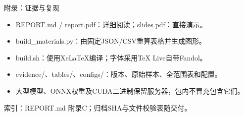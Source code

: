 \documentclass[UTF8,fontset=fandol,aspectratio=169,10pt]{ctexbeamer}
\begin{document}
\begin{frame}{附录：证据与复现}
\begin{itemize}
\item REPORT.md /\allowbreak{} report.pdf：详细阅读；slides.pdf：直接演示。
\item build\_\allowbreak{}materials.py：由固定JSON/\allowbreak{}CSV重算表格并生成图形。
\item build.sh：使用XeLaTeX编译；字体采用TeX Live自带Fandol。
\item evidence/\allowbreak{}、tables/\allowbreak{}、configs/\allowbreak{}：版本、原始样本、全范围表和配置。
\item 大型模型、ONNX权重及CUDA二进制保留服务器，包内不冒充包含它们。
\end{itemize}\par\vfill{\fontsize{6.5}{8}\selectfont\color{gray}索引：REPORT.md 附录C；归档SHA与文件校验表随交付。} 
\end{frame}
\end{document}

